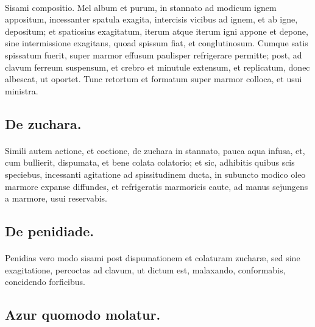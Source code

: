 \documentclass[a4paper, 11pt, oneside, polutonikogreek, italian]{article}
\begin{document}
\paragraph{}
Sisami compositio. Mel album et purum, in stannato ad modicum ignem appositum, incessanter spatula exagita, intercisis vicibus ad ignem, et ab igne, depositum; et spatiosius exagitatum, iterum atque iterum igni appone et depone, sine intermissione exagitans, quoad spissum fiat, et conglutinosum. Cumque satis spissatum fuerit, super marmor effusum paulisper refrigerare permitte; post, ad clavum ferreum suspensum, et crebro et minutule extensum, et replicatum, donec albescat, ut oportet. Tunc retortum et formatum super marmor colloca, et usui ministra.

\subsection{De zuchara.}
\paragraph{}
Simili autem actione, et coctione, de zuchara in stannato, pauca aqua infusa, et, cum bullierit, dispumata, et bene colata colatorio; et sic, adhibitis quibus scis speciebus, incessanti agitatione ad spissitudinem ducta, in subuncto modico oleo marmore expanse diffundes, et refrigeratis marmoricis caute, ad manus sejungens a marmore, usui reservabis.

\subsection{De penidiade.}
\paragraph{}
Penidias vero modo sisami post dispumationem et colaturam zucharæ, sed sine exagitatione, percoctas ad clavum, ut dictum est, malaxando, conformabis, concidendo forficibus.

\subsection{Azur quomodo molatur.}
\end{document}
